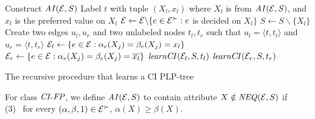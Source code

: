 \begin{algorithm}[ht]
	Construct $\mathit{AI}(\mathcal{E},S)$\;
	Label $t$ with tuple $(X_l,x_l)$ where $X_l$ is from $\mathit{AI}(\mathcal{E},S)$, 
		and $x_l$ is the preferred value on $X_l$\;
	$\mathcal{E} \leftarrow \mathcal{E} \backslash \{e \in \mathcal{E}^\succ: e$ is decided on $X_l\}$\;
	$S \leftarrow S \backslash \{X_l\}$\;
	Create two edges $u_l,u_r$ and two unlabeled nodes $t_l,t_r$ such that $u_l=\langle t,t_l\rangle$
		and $u_r=\langle t,t_r\rangle$\;
	$\mathcal{E}_l \leftarrow \{e\in \mathcal{E}: \alpha_e(X_j)=\beta_e(X_j)=x_l\}$\;
	$\mathcal{E}_r \leftarrow \{e\in \mathcal{E}: \alpha_e(X_j)=\beta_e(X_j)=\overline{x_l}\}$\;
	$\mathit{learnCI}(\mathcal{E}_l,S,t_l)$\;
	$\mathit{learnCI}(\mathcal{E}_r,S,t_r)$\;

\caption{The recursive procedure  that learns a CI PLP-tree \label{alg:recur_learnCI}}
\end{algorithm}

For class $\textit{CI}$-$\textit{FP}$, we define $\mathit{AI}(\mathcal{E},S)$ to contain attribute 
$X\notin \mathit{NEQ}(\mathcal{E},S)$ if\\
(3) \ for every $(\alpha,\beta,1) \in \mathcal{E}^\succ$,  $\alpha(X) \geq \beta(X)$.

